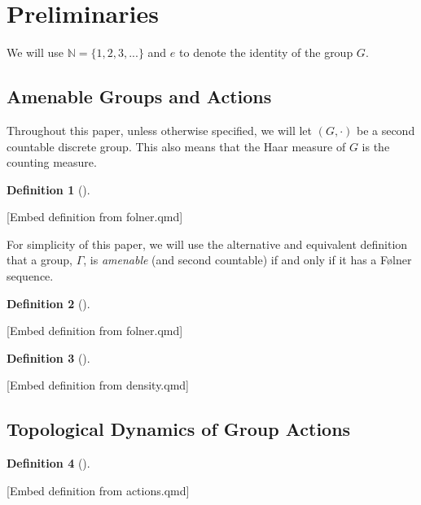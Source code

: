 \documentclass[
  british,
]{article}
\theoremstyle{plain}
\theoremstyle{definition}
\newtheorem{definition}{Definition}[section]
\theoremstyle{remark}
\newcommand{\AmenableGroup}{{\Gamma}}
\newcommand{\Group}{{G}}
\newcommand{\Identity}{{e}}
\begin{document}
\section{Preliminaries}\label{preliminaries}

We will use \(\mathbb{N}=\{1,2,3,...\}\) and \(\Identity\) to denote the
identity of the group \(\Group\).

\subsection{Amenable Groups and
Actions}\label{amenable-groups-and-actions}

Throughout this paper, unless otherwise specified, we will let
\((G,\cdot)\) be a second countable discrete group. This also means that
the Haar measure of \(G\) is the counting measure.

\begin{definition}[]\protect\hypertarget{def-FolnerSequenceDef}{}\label{def-FolnerSequenceDef}

{[}Embed definition from folner.qmd{]}

\end{definition}

For simplicity of this paper, we will use the alternative and equivalent
definition that a group, \(\AmenableGroup\), is \emph{amenable} (and
second countable) if and only if it has a Følner sequence.

\begin{definition}[]\protect\hypertarget{def-TemperedSequenceDef}{}\label{def-TemperedSequenceDef}

{[}Embed definition from folner.qmd{]}

\end{definition}

\begin{definition}[]\protect\hypertarget{def-DensityDef}{}\label{def-DensityDef}

{[}Embed definition from density.qmd{]}

\end{definition}

\subsection{Topological Dynamics of Group
Actions}\label{topological-dynamics-of-group-actions}

\begin{definition}[]\protect\hypertarget{def-ActionDef}{}\label{def-ActionDef}

{[}Embed definition from actions.qmd{]}

\end{definition}
\end{document}
